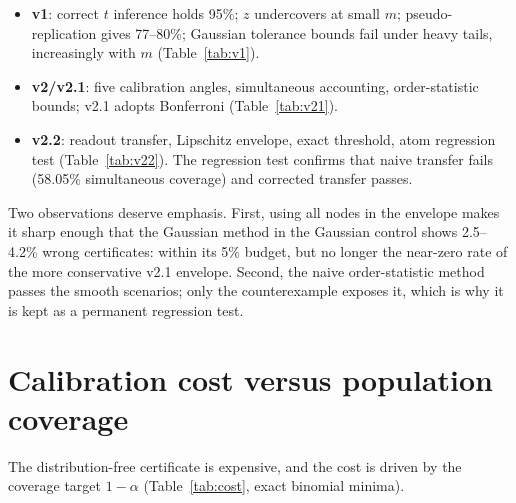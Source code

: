 \documentclass[11pt]{article}
\theoremstyle{definition}
\begin{document}
\begin{itemize}[nosep]
\item \textbf{v1}: correct $t$ inference holds 95\%; $z$ undercovers at small $m$; pseudo-replication gives 77--80\%; Gaussian tolerance bounds fail under heavy tails, increasingly with $m$ (Table~\ref{tab:v1}).
\item \textbf{v2/v2.1}: five calibration angles, simultaneous accounting, order-statistic bounds; v2.1 adopts Bonferroni (Table~\ref{tab:v21}).
\item \textbf{v2.2}: readout transfer, Lipschitz envelope, exact threshold, atom regression test (Table~\ref{tab:v22}). The regression test confirms that naive transfer fails (58.05\% simultaneous coverage) and corrected transfer passes.
\end{itemize}

\begin{table}[h]\centering\small
\resizebox{\textwidth}{!}{}
\caption{v2.2 results. ``95\% upper'' is the Clopper--Pearson bound \cite{clopper} on the wrong-certificate rate; ``truth'' is the true start of the certifiable interval. Every run issued a certificate. Median readout allowances $\delta$: $11.8''$ (Gaussian readout), $36.4''$ ($t_4$), $19.9''$ (atom).}\label{tab:v22}
\end{table}

Two observations deserve emphasis. First, using all nodes in the envelope makes it sharp enough that the Gaussian method in the Gaussian control shows 2.5--4.2\% wrong certificates: within its 5\% budget, but no longer the near-zero rate of the more conservative v2.1 envelope. Second, the naive order-statistic method passes the smooth scenarios; only the counterexample exposes it, which is why it is kept as a permanent regression test.

\section{Calibration cost versus population coverage}\label{sec:cost}
The distribution-free certificate is expensive, and the cost is driven by the coverage target $1-\alpha$ (Table~\ref{tab:cost}, exact binomial minima).

\begin{table}[h]\centering\small
\resizebox{\textwidth}{!}{}
\caption{Minimum calibration sizes for the v2.2 procedure ($r=1$ order statistics, six Bonferroni events).}\label{tab:cost}
\end{table}
\end{document}
